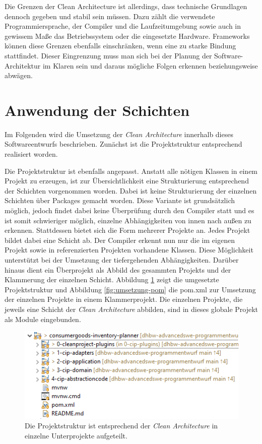 Die Grenzen der Clean Architecture ist allerdings, dass technische Grundlagen dennoch gegeben und stabil sein müssen.
Dazu zählt die verwendete Programmiersprache, der Compiler und die Laufzeitumgebung sowie auch in gewissem Maße das Betriebssystem oder die eingesetzte Hardware.
Frameworks können diese Grenzen ebenfalls einschränken, wenn eine zu starke Bindung stattfindet.
Dieser Eingrenzung muss man sich bei der Planung der Software-Architektur im Klaren sein und daraus mögliche Folgen erkennen beziehungsweise abwägen.

\section{Anwendung der Schichten}
Im Folgenden wird die Umsetzung der \textit{Clean Architecture} innerhalb dieses Softwareentwurfs beschrieben.
Zunächst ist die Projektstruktur entsprechend realisiert worden.

Die Projektstruktur ist ebenfalls angepasst.
Anstatt alle nötigen Klassen in einem Projekt zu erzeugen, ist zur Übersichtlichkeit eine Strukturierung entsprechend der Schichten vorgenommen worden.
Dabei ist keine Strukturierung der einzelnen Schichten über Packages gemacht worden.
Diese Variante ist grundsätzlich möglich, jedoch findet dabei keine Überprüfung durch den Compiler statt und es ist somit schwieriger möglich, einzelne Abhängigkeiten von innen nach außen zu erkennen.
Stattdessen bietet sich die Form mehrerer Projekte an.
Jedes Projekt bildet dabei eine Schicht ab.
Der Compiler erkennt nun nur die im eigenen Projekt sowie in referenzierten Projekten vorhandene Klassen.
Diese Möglichkeit unterstützt bei der Umsetzung der tiefergehenden Abhängigkeiten.
Darüber hinaus dient ein Überprojekt als Abbild des gesammten Projekts und der Klammerung der einzelnen Schicht.
Abbildung \ref{fig:projektstruktur} zeigt die umgesetzte Projektstruktur und Abbildung \ref{fig:umsetzung-pom} die pom.xml zur Umsetzung der einzelnen Projekte in einem Klammerprojekt.
Die einzelnen Projekte, die jeweils eine Schicht der \textit{Clean Architecture} abbilden, sind in dieses globale Projekt als Module eingebunden.

\begin{figure}[H]
	\centering
	\includegraphics[width=1.0\textwidth]{Bilder/projektstruktur.PNG}
	\caption[Aufteilung der Projektstruktur entsprechend \textit{Clean Architecture}.]{Die Projektstruktur ist entsprechend der \textit{Clean Architecture} in einzelne Unterprojekte aufgeteilt.}
	\label{fig:projektstruktur}
\end{figure}

